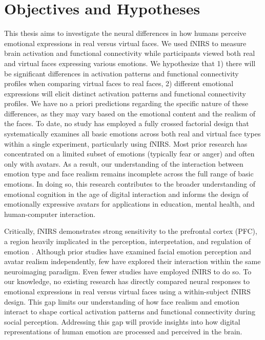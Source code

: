 \section{Objectives and Hypotheses}
This thesis aims to investigate the neural differences in how humans perceive emotional expressions in real versus virtual faces. 
We used fNIRS to measure brain activation and functional connectivity while participants viewed both real and virtual faces expressing various emotions.
We hypothesize that 1) there will be significant differences in activation patterns and functional connectivity profiles when comparing virtual faces to real faces, 
2) different emotional expressions will elicit distinct activation patterns and functional connectivity profiles. 
We have no a priori predictions regarding the specific nature of these differences, as they may vary based on the emotional content and the realism of the faces.
To date, no study has employed a fully crossed factorial design that systematically examines all basic emotions across both real and virtual face types within a single experiment, particularly using fNIRS. 
Most prior research has concentrated on a limited subset of emotions (typically fear or anger) and often only with avatars. 
As a result, our understanding of the interaction between emotion type and face realism remains incomplete across the full range of basic emotions.
In doing so, this research contributes to the broader understanding of emotional cognition in the age of digital interaction and informs the design of emotionally expressive avatars for applications in education, mental health, and human-computer interaction.

Critically, fNIRS demonstrates strong sensitivity to the prefrontal cortex (PFC), a region heavily implicated in the perception, interpretation, and regulation of emotion \citep{westgarth_systematic_2021, bendall_brief_2016}.
Although prior studies have examined facial emotion perception and avatar realism independently, few have explored their interaction within the same neuroimaging paradigm. 
Even fewer studies have employed fNIRS to do so. 
To our knowledge, no existing research has directly compared neural responses to emotional expressions in real versus virtual faces using a within-subject fNIRS design. 
This gap limits our understanding of how face realism and emotion interact to shape cortical activation patterns and functional connectivity during social perception. 
Addressing this gap will provide insights into how digital representations of human emotion are processed and perceived in the brain.

